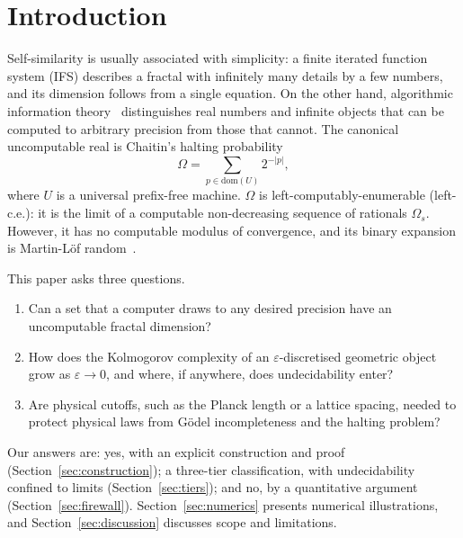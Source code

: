 \documentclass[11pt]{article}
\theoremstyle{definition}\newtheorem{definition}{Definition}[section]
\theoremstyle{remark}\newtheorem*{remark}{Remark}
\begin{document}
\section{Introduction}
\label{sec:intro}

Self-similarity is usually associated with simplicity: a finite iterated function system (IFS) describes a
fractal with infinitely many details by a few numbers, and its dimension follows from a single equation. On the
other hand, algorithmic information theory~\cite{LiVitanyi,DowneyHirschfeldt} distinguishes real numbers and
infinite objects that can be computed to arbitrary precision from those that cannot. The canonical
uncomputable real is Chaitin's halting probability~\cite{Chaitin75}
\begin{equation}
\Omega=\sum_{p\in\mathrm{dom}(U)}2^{-|p|},
\end{equation}
where $U$ is a universal prefix-free machine. $\Omega$ is left-computably-enumerable (left-c.e.): it is the limit
of a computable non-decreasing sequence of rationals $\Omega_s$. However, it has no computable modulus of
convergence, and its binary expansion is Martin-L\"of random~\cite{MartinLof,Chaitin75}.

This paper asks three questions.
\begin{enumerate}
\item Can a set that a computer draws to any desired precision have an uncomputable fractal dimension?
\item How does the Kolmogorov complexity of an $\varepsilon$-discretised geometric object grow as
$\varepsilon\to0$, and where, if anywhere, does undecidability enter?
\item Are physical cutoffs, such as the Planck length or a lattice spacing, needed to protect physical laws from
G\"odel incompleteness and the halting problem?
\end{enumerate}
Our answers are: yes, with an explicit construction and proof (Section~\ref{sec:construction}); a three-tier
classification, with undecidability confined to limits (Section~\ref{sec:tiers}); and no, by a quantitative
argument (Section~\ref{sec:firewall}). Section~\ref{sec:numerics} presents numerical illustrations, and
Section~\ref{sec:discussion} discusses scope and limitations.
\end{document}
